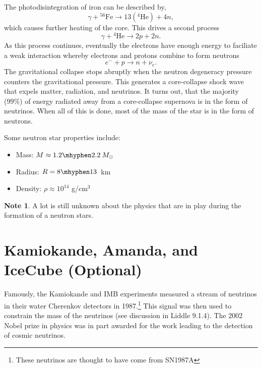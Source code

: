 \documentclass[a4paper,12pt]{article}
\theoremstyle{remark}
\newcommand{\mrm}[1]{\mathrm{#1}}
\renewcommand{\=}[1]{\stackrel{#1}{=}} %
\theoremstyle{plain}
\theoremstyle{definition}
\newtheorem*{definitionT}{Note}%
\newenvironment{note}{
\begin{dBox}
\begin{definitionT}}
{\end{definitionT}
\end{dBox}}
\begin{document}
The photodisintegration of iron can be described by,
\begin{equation}
\gamma + {}^{56}\mrm{Fe} \rightarrow 13({}^4\mrm{He}) + 4n,
\end{equation}
which causes further heating of the core. This drives a second process 
\begin{equation}
\gamma + {}^4 \mrm{He} \rightarrow 2p + 2n.
\end{equation}
As this process continues, eventually the electrons have enough energy to faciliate a weak interaction whereby electrons and protons combine to form neutrons
\begin{equation}
e^{-} + p \rightarrow n + \nu _e.
\end{equation} 
The gravitational collapse stops abruptly when the neutron degeneracy pressure counters the gravitational pressure. This generates a core-collapse shock wave that expels matter, radiation, and neutrinos. It turns out, that the majority (99\%) of energy radiated away from a core-collapse supernova is in the form of neutrinos. When all of this is done, most of the mass of the star is in the form of neutrons.

Some neutron star properties include:
\vspace{-7mm}
\begin{itemize}
\item Mass:  $M \approx 1.2 \mhyphen 2.2 \: M_\odot$
\item Radius: $R = 8 \mhyphen 13$~km
\item Density: $\rho \approx 10^{14}$ g/cm$^{3}$
\end{itemize}

\begin{note}
A lot is still unknown about the physics that are in play during the formation of a neutron stars. 
\end{note}

\section{Kamiokande, Amanda, and IceCube (Optional)}
Famously, the Kamiokande and IMB experiments measured a stream of neutrinos in their water Cherenkov detectors in 1987.\footnote{These neutrinos are thought to have come from SN1987A} This signal was then used to constrain the mass of the neutrinos (see discussion in Liddle 9.1.4). The 2002 Nobel prize in physics was in part awarded for the work leading to the detection of cosmic neutrinos.
\end{document}
